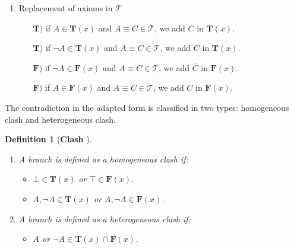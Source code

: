 \documentclass{article}
\newtheorem{mydef}{Definition}
\begin{document}
\begin{enumerate}
	 \item Replacement of axioms in $\mathcal{T}$
	       \begin{itemize}
	        \item  [$\mathbf{T)}$] if $A \in \mathbf{T}(x)$ and $A \equiv C \in \mathcal{T}$, we add $C$ in $\mathbf{T}(x)$.
		\item  [$\mathbf{T)}$] if $ \neg A \in \mathbf{T}(x)$ and $A \equiv C \in \mathcal{T}$, we add $\overline{C}$ in $\mathbf{T}(x)$.
	        \item  [$\mathbf{F)}$] if $ \neg A \in \mathbf{F}(x)$ and $A \equiv C \in \mathcal{T}$, we add $\overline{C}$ in $\mathbf{F}(x)$. 	
	        \item  [$\mathbf{F)}$] if $ A \in \mathbf{F}(x)$ and $A \equiv C \in \mathcal{T}$, we add $C$ in $\mathbf{F}(x)$.
	       \end{itemize}     
\end{enumerate}

The contradiction in the adapted form is classified in two types: homogeneous clash and heterogeneous clash. 
\begin{mydef}[\textbf{Clash} \cite{colucci2004uniform}]\label{clash}
\begin{enumerate}
	 \item A branch is defined as a homogeneous clash if:
	       \begin{itemize}
	        \item  $\bot \in \mathbf{T}(x)$ or $\top \in \mathbf{F}(x)$.
	        \item  $A,\neg A \in \mathbf{T}(x)$ or $A,\neg A \in \mathbf{F}(x)$.
		\end{itemize}
	 \item A branch is defined as a heterogeneous clash if:
	       \begin{itemize}
	        \item   $A$ or $\neg A \in \mathbf{T}(x) \cap \mathbf{F}(x)$. 
	       \end{itemize}     
\end{enumerate}
\end{mydef}
\end{document}
